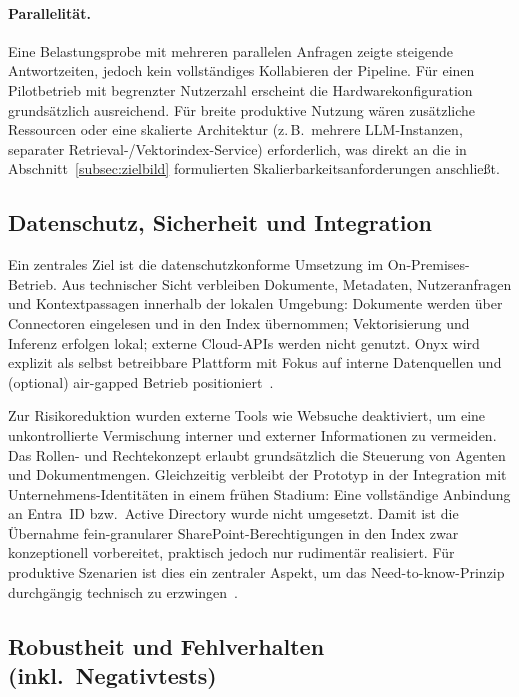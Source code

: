 \paragraph{Parallelität.}
Eine Belastungsprobe mit mehreren parallelen Anfragen zeigte steigende Antwortzeiten, jedoch kein vollständiges Kollabieren der Pipeline.
Für einen Pilotbetrieb mit begrenzter Nutzerzahl erscheint die Hardwarekonfiguration grundsätzlich ausreichend.
Für breite produktive Nutzung wären zusätzliche Ressourcen oder eine skalierte Architektur (z.\,B.\ mehrere LLM-Instanzen, separater Retrieval-/Vektorindex-Service) erforderlich, was direkt an die in Abschnitt~\ref{subsec:zielbild} formulierten Skalierbarkeitsanforderungen anschließt.

\subsection{Datenschutz, Sicherheit und Integration}\label{subsec:evaluation-datenschutz}

Ein zentrales Ziel ist die datenschutzkonforme Umsetzung im On-Premises-Betrieb.
Aus technischer Sicht verbleiben Dokumente, Metadaten, Nutzeranfragen und Kontextpassagen innerhalb der lokalen Umgebung:
Dokumente werden über Connectoren eingelesen und in den Index übernommen; Vektorisierung und Inferenz erfolgen lokal; externe Cloud-APIs werden nicht genutzt.
Onyx wird explizit als selbst betreibbare Plattform mit Fokus auf interne Datenquellen und (optional) air-gapped Betrieb positioniert~\cite{onyx_github}.

Zur Risikoreduktion wurden externe Tools wie Websuche deaktiviert, um eine unkontrollierte Vermischung interner und externer Informationen zu vermeiden.
Das Rollen- und Rechtekonzept erlaubt grundsätzlich die Steuerung von Agenten und Dokumentmengen.
Gleichzeitig verbleibt der Prototyp in der Integration mit Unternehmens-Identitäten in einem frühen Stadium:
Eine vollständige Anbindung an Entra~ID bzw.\ Active Directory wurde nicht umgesetzt.
Damit ist die Übernahme fein-granularer SharePoint-Berechtigungen in den Index zwar konzeptionell vorbereitet, praktisch jedoch nur rudimentär realisiert.
Für produktive Szenarien ist dies ein zentraler Aspekt, um das Need-to-know-Prinzip durchgängig technisch zu erzwingen~\cite{saltzer_schroeder}.

\subsection{Robustheit und Fehlverhalten (inkl.\ Negativtests)}\label{subsec:eval-robustheit}

